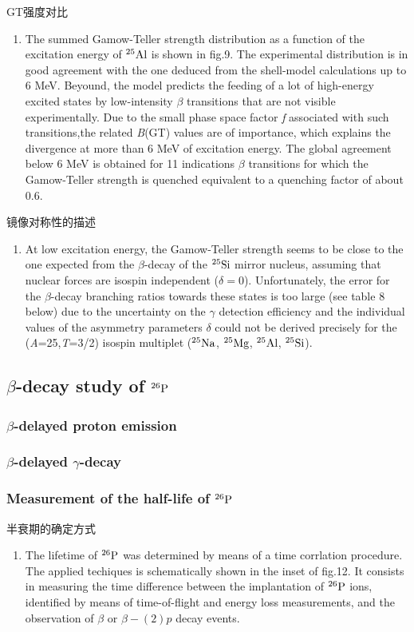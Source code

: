 \documentclass[a4paper]{article}
\begin{document}
GT强度对比
\begin{enumerate}
    \item The summed Gamow-Teller strength distribution as a function of the excitation energy of $^{25}\textnormal{Al}$ is shown in fig.9. The experimental distribution is in good agreement with the one deduced from the shell-model calculations up to 6 MeV. Beyound, the model predicts the feeding of a lot of high-energy excited states by low-intensity $\beta$ transitions that are not visible experimentally. Due to the small phase space factor \textit{f} associated with such transitions,the related \textit{B}(GT) values are of importance, which explains the divergence at more than 6 MeV of excitation energy. The global agreement below 6 MeV is obtained for 11 indications $\beta$ transitions for which the Gamow-Teller strength is quenched equivalent to a quenching factor of about 0.6.
\end{enumerate}


镜像对称性的描述
\begin{enumerate}
    \item At low excitation energy, the Gamow-Teller strength seems to be close to the one expected from the $\beta$-decay of the $^{25}\textnormal{Si}$ mirror nucleus, assuming that nuclear forces are isospin independent ($\delta=0$). Unfortunately, the error for the $\beta$-decay branching ratios towards these states is too large (see table 8 below) due to the uncertainty on the $\gamma$ detection efficiency and the individual values of the asymmetry parameters $\delta$ could not be derived precisely for the (\textit{A}=25,\textit{T}=3/2) isospin multiplet ($^{25}\textnormal{Na}$, $^{25}\textnormal{Mg}$, $^{25}\textnormal{Al}$, $^{25}\textnormal{Si}$).
\end{enumerate}

\subsection{$\beta$-decay study of $^{26}\textnormal{P}$}

\subsubsection{$\beta$-delayed proton emission}
\subsubsection{$\beta$-delayed $\gamma$-decay}
\subsubsection{Measurement of the half-life of $^{26}\textnormal{P}$}
半衰期的确定方式
\begin{enumerate}
    \item The lifetime of $^{26}\textnormal{P}$ was determined by means of a time corrlation procedure. The applied techiques is schematically shown in the inset of fig.12. It consists in measuring the time difference between the implantation of $^{26}\textnormal{P}$ ions, identified by means of time-of-flight and energy loss measurements, and the observation of $\beta$ or $\beta-(2)p$ decay events.
\end{enumerate}
\end{document}
